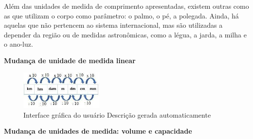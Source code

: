 \begin{escolha}
\begin{escolha}
\begin{escolha}
\begin{escolha}
{\begin{boxmedio}
\begin{boxpeq}
\begin{q°}
\begin{boxmedio}
\begin{boxpeq}
\begin{boxpeq}
\begin{boxmedio}
\begin{boxmedio}
\begin{boxmedio}
\begin{largebox}
\begin{boxmedio}
{Além das unidades de medida de comprimento apresentadas, existem outras
como as que utilizam o corpo como parâmetro: o palmo, o pé, a polegada.
Ainda, há aquelas que não pertencem ao sistema internacional, mas são
utilizadas a depender da região ou de medidas astronômicas, como a
légua, a jarda, a milha e o ano-luz.

\textbf{Mudança de unidade de medida linear}

\begin{figure}
\centering
\includegraphics[width=1.63366in,height=0.76567in]{./_SAEB_9_MAT/media/image227.jpeg}
\caption{Interface gráfica do usuário Descrição gerada automaticamente}
\end{figure}


\textbf{Mudança de unidades de medida: volume e capacidade}

}
\end{boxmedio}
\end{largebox}
\end{boxmedio}
\end{boxmedio}
\end{boxmedio}
\end{boxpeq}
\end{boxpeq}
\end{boxmedio}
\end{q°}
\end{boxpeq}
\end{boxmedio}}
\end{escolha}
\end{escolha}
\end{escolha}
\end{escolha}
